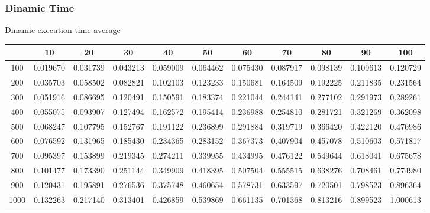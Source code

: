 \documentclass[12]{beamer}
\begin{document}
\begin{frame}
\frametitle{Dinamic Time }

Dinamic execution time average
\begin{center}
\begin{adjustbox}{max width=\textwidth}
\small
\begin{tabular}{ |c|c|c|c|c|c|c|c|c|c|c|}
\hline
  & 10 & 20 & 30 & 40 & 50 & 60 & 70 & 80 & 90 & 100 \\ 
\hline
 100 & 0.019670 & 0.031739 & 0.043213 & 0.059009 & 0.064462 & 0.075430 & 0.087917 & 0.098139 & 0.109613 & 0.120729 \\ 
\hline
 200 & 0.035703 & 0.058502 & 0.082821 & 0.102103 & 0.123233 & 0.150681 & 0.164509 & 0.192225 & 0.211835 & 0.231564 \\ 
\hline
 300 & 0.051916 & 0.086695 & 0.120491 & 0.150591 & 0.183374 & 0.221044 & 0.244141 & 0.277102 & 0.291973 & 0.289261 \\ 
\hline
 400 & 0.055075 & 0.093907 & 0.127494 & 0.162572 & 0.195414 & 0.236988 & 0.254810 & 0.281721 & 0.321269 & 0.362098 \\ 
\hline
 500 & 0.068247 & 0.107795 & 0.152767 & 0.191122 & 0.236899 & 0.291884 & 0.319719 & 0.366420 & 0.422120 & 0.476986 \\ 
\hline
 600 & 0.076592 & 0.131965 & 0.185430 & 0.234365 & 0.283152 & 0.367373 & 0.407904 & 0.457078 & 0.510603 & 0.571817 \\ 
\hline
 700 & 0.095397 & 0.153899 & 0.219345 & 0.274211 & 0.339955 & 0.434995 & 0.476122 & 0.549644 & 0.618041 & 0.675678 \\ 
\hline
 800 & 0.101477 & 0.173390 & 0.251144 & 0.349909 & 0.418395 & 0.507504 & 0.555515 & 0.638276 & 0.708461 & 0.774980 \\ 
\hline
 900 & 0.120431 & 0.195891 & 0.276536 & 0.375748 & 0.460654 & 0.578731 & 0.633597 & 0.720501 & 0.798523 & 0.896364 \\ 
\hline
 1000 & 0.132263 & 0.217140 & 0.313401 & 0.426859 & 0.539869 & 0.661135 & 0.701368 & 0.813216 & 0.899523 & 1.000613 \\ 
\hline
\end{tabular}
\end{adjustbox}
\end{center}

\end{frame}
\end{document}
